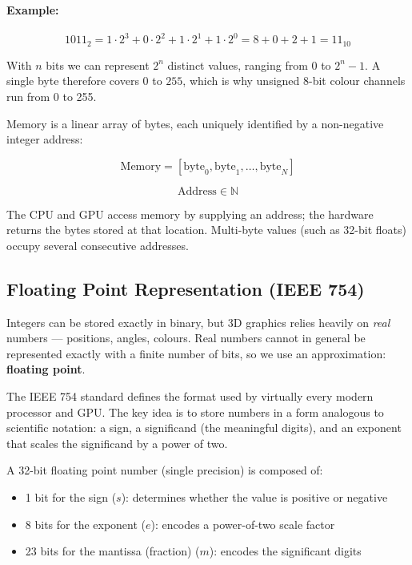 \documentclass[11pt]{article}
\begin{document}
\paragraph{Example:}
\begin{equation}
    1011_2 = 1 \cdot 2^3 + 0 \cdot 2^2 + 1 \cdot 2^1 + 1 \cdot 2^0 = 8 + 0 + 2 + 1 = 11_{10}
\end{equation}

With $n$ bits we can represent $2^n$ distinct values, ranging from $0$ to $2^n - 1$. A single byte therefore covers $0$ to $255$, which is why unsigned 8-bit colour channels run from 0 to 255.

Memory is a linear array of bytes, each uniquely identified by a non-negative integer address:

\begin{equation}
    \text{Memory} = [\text{byte}_0, \text{byte}_1, \dots, \text{byte}_N]
\end{equation}

\begin{equation}
    \text{Address} \in \mathbb{N}
\end{equation}

The CPU and GPU access memory by supplying an address; the hardware returns the bytes stored at that location. Multi-byte values (such as 32-bit floats) occupy several consecutive addresses.


\subsection{Floating Point Representation (IEEE 754)}

Integers can be stored exactly in binary, but 3D graphics relies heavily on \emph{real} numbers --- positions, angles, colours. Real numbers cannot in general be represented exactly with a finite number of bits, so we use an approximation: \textbf{floating point}.

The IEEE 754 standard defines the format used by virtually every modern processor and GPU. The key idea is to store numbers in a form analogous to scientific notation: a sign, a significand (the meaningful digits), and an exponent that scales the significand by a power of two.

A 32-bit floating point number (single precision) is composed of:

\begin{itemize}
    \item 1 bit for the sign ($s$): determines whether the value is positive or negative
    \item 8 bits for the exponent ($e$): encodes a power-of-two scale factor
    \item 23 bits for the mantissa (fraction) ($m$): encodes the significant digits
\end{itemize}
\end{document}

